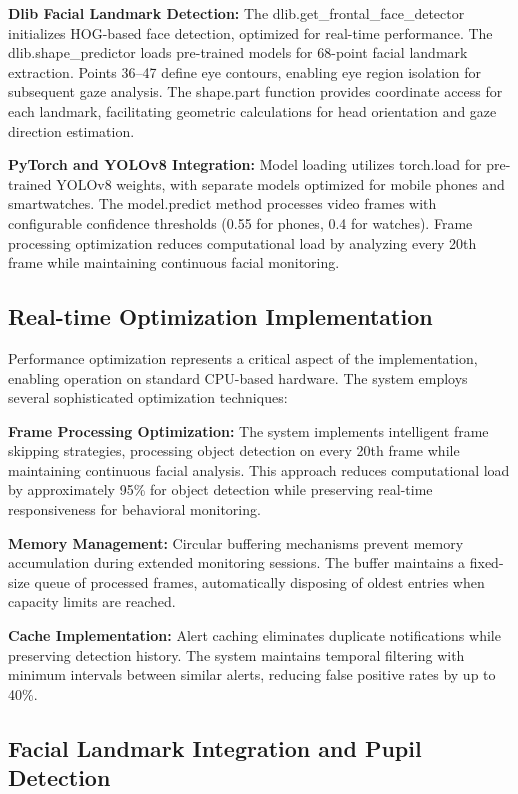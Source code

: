 \documentclass[conference]{IEEEtran}
\begin{document}
\textbf{Dlib Facial Landmark Detection:} The dlib.get\_frontal\_face\_detector 
initializes HOG-based face detection, optimized for real-time performance. The 
dlib.shape\_predictor loads pre-trained models for 68-point facial landmark 
extraction. Points 36--47 define eye contours, enabling eye region 
isolation for subsequent gaze analysis. The shape.part function provides coordinate 
access for each landmark, facilitating geometric calculations for head orientation and 
gaze direction estimation.

\textbf{PyTorch and YOLOv8 Integration:} Model loading utilizes torch.load for 
pre-trained YOLOv8 weights, with separate models optimized for mobile phones and smartwatches. 
The model.predict method processes video frames with configurable confidence 
thresholds (0.55 for phones, 0.4 for watches). Frame processing optimization reduces 
computational load by analyzing every 20th frame while maintaining continuous facial monitoring.

\subsection{Real-time Optimization Implementation}

Performance optimization represents a critical aspect of the implementation, enabling 
operation on standard CPU-based hardware. The system employs several sophisticated 
optimization techniques:

\textbf{Frame Processing Optimization:} The system implements intelligent frame skipping 
strategies, processing object detection on every 20th frame while maintaining continuous 
facial analysis. This approach reduces computational load by approximately 95\% for object 
detection while preserving real-time responsiveness for behavioral monitoring.

\textbf{Memory Management:} Circular buffering mechanisms prevent memory accumulation 
during extended monitoring sessions. The buffer maintains a fixed-size queue of processed 
frames, automatically disposing of oldest entries when capacity limits are reached.

\textbf{Cache Implementation:} Alert caching eliminates duplicate notifications while 
preserving detection history. The system maintains temporal filtering with minimum intervals 
between similar alerts, reducing false positive rates by up to 40\%.

\subsection{Facial Landmark Integration and Pupil Detection}
\end{document}
